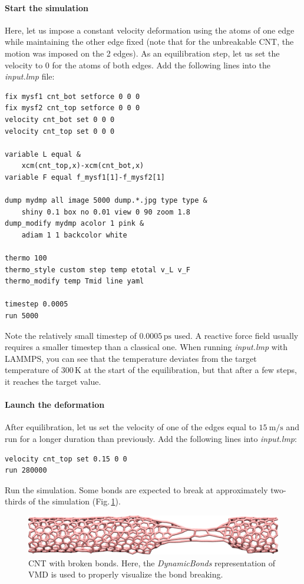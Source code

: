 \documentclass[9pt,tutorial]{livecoms}
\begin{document}
\paragraph{Start the simulation}
Here, let us impose a constant velocity deformation using the atoms of one
edge while maintaining the other edge fixed (note that for the unbreakable CNT,
the motion was imposed on the 2 edges). As an equilibration step, let us set the
velocity to 0 for the atoms of both edges. Add the following lines into
the \textit{input.lmp} file:
\begin{lstlisting}
fix mysf1 cnt_bot setforce 0 0 0
fix mysf2 cnt_top setforce 0 0 0
velocity cnt_bot set 0 0 0
velocity cnt_top set 0 0 0

variable L equal &
    xcm(cnt_top,x)-xcm(cnt_bot,x)
variable F equal f_mysf1[1]-f_mysf2[1]

dump mydmp all image 5000 dump.*.jpg type type &
    shiny 0.1 box no 0.01 view 0 90 zoom 1.8
dump_modify mydmp acolor 1 pink &
    adiam 1 1 backcolor white

thermo 100
thermo_style custom step temp etotal v_L v_F
thermo_modify temp Tmid line yaml

timestep 0.0005
run 5000
\end{lstlisting}
Note the relatively small timestep of $0.0005\,\text{ps}$ used. A reactive force
field usually requires a smaller timestep than a classical one. When running
\textit{input.lmp} with LAMMPS, you can see that the temperature deviates
from the target temperature of $300\,\text{K}$ at the start of the equilibration,
but that after a few steps, it reaches the target value.

\paragraph{Launch the deformation}
After equilibration, let us set the velocity of one of the edges equal to
$15~\text{m/s}$ and run for a longer duration than previously. Add the following
lines into \textit{input.lmp}:
\begin{lstlisting}
velocity cnt_top set 0.15 0 0
run 280000
\end{lstlisting}
Run the simulation. Some bonds are expected to break at approximately
two-thirds of the simulation (Fig.\,\ref{fig:CNT-deformed-breakable}).

\begin{figure}
\centering
\includegraphics[width=\linewidth]{CNT-deformed-breakable}
\caption{CNT with broken bonds. Here, the \textit{DynamicBonds} representation
of VMD is used to properly visualize the bond breaking.}
\label{fig:CNT-deformed-breakable}
\end{figure}
\end{document}
